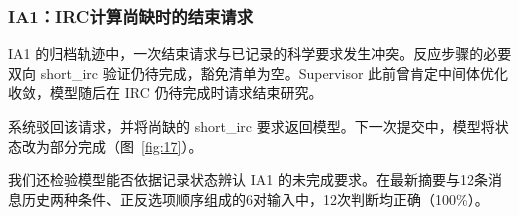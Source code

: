 \subsubsection{IA1：IRC计算尚缺时的结束请求}

IA1 的归档轨迹中，一次结束请求与已记录的科学要求发生冲突。反应步骤的必要双向 short\_irc 验证仍待完成，豁免清单为空。Supervisor 此前曾肯定中间体优化收敛，模型随后在 IRC 仍待完成时请求结束研究。

系统驳回该请求，并将尚缺的 short\_irc 要求返回模型。下一次提交中，模型将状态改为部分完成（图~\ref{fig:17}）。

我们还检验模型能否依据记录状态辨认 IA1 的未完成要求。在最新摘要与12条消息历史两种条件、正反选项顺序组成的6对输入中，12次判断均正确（100\%）。


